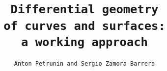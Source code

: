 \title{\tt Differential geometry\\ of curves and surfaces:\\ a working approach}
\author{\tt Anton Petrunin and Sergio Zamora Barrera}
\date{}
\maketitle
\thispagestyle{empty}
